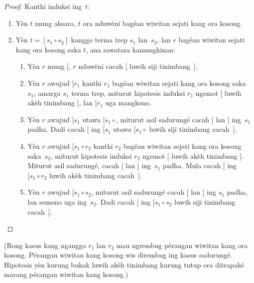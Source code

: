 \documentclass[../../../include/open-logic-section]{subfiles}
\begin{document}
\begin{proof}
  Kanthi induksi ing~$t$:
  \begin{enumerate}
  \item Yèn $t$ mung aksara,
    $t$ ora nduwèni bagéan
    wiwitan sejati kang ora kosong.
  \item Yèn $t = [s_1 \circ s_2]$
    kanggo terma trep $s_1$
    lan~$s_2$, lan $r$ bagéan
    wiwitan sejati kang ora kosong
    saka $t$, ana sawatara
    kamungkinan:
    \begin{enumerate}
    \item Yèn $r$ mung $[$,
      $r$ nduwèni cacah $[$
      luwih siji tinimbang~$]$.
    \item Yèn $r$ awujud
      $[r_1$ kanthi $r_1$
      bagéan wiwitan sejati kang ora kosong
      saka~$s_1$, amarga
      $s_1$ terma trep,
      miturut hipotesis
      induksi $r_1$
      ngemot $[$ luwih
      akèh tinimbang $]$,
      lan $[r_1$ uga
      mangkono.
    \item Yèn $r$ awujud
      $[s_1$ utawa
      $[s_1 \circ {}$,
      miturut asil sadurungé
      cacah $[$ lan $]$
      ing~$s_1$ padha.
      Dadi cacah $[$
      ing $[s_1$ utawa
      $[s_1 \circ {}$
      luwih siji tinimbang
      cacah~$]$.
    \item Yèn $r$ awujud
      $[s_1 \circ r_2$
      kanthi $r_2$ bagéan
      wiwitan sejati kang ora kosong
      saka~$s_2$, miturut
      hipotesis induksi
      $r_2$ ngemot $[$
      luwih akèh tinimbang
      $]$. Miturut asil
      sadurungé, cacah $[$
      lan $]$ ing~$s_1$
      padha. Mula cacah $[$
      ing $[s_1 \circ r_2$
      luwih akèh tinimbang
      cacah~$]$.
    \item Yèn $r$ awujud
      $[s_1 \circ s_2$,
      miturut asil sadurungé
      cacah $[$ lan $]$
      ing $s_1$ padha,
      lan semono uga
      ing~$s_2$. Dadi
      cacah $[$ ing
      $[s_1 \circ s_2$
      luwih siji tinimbang
      cacah~$]$.
    \end{enumerate}
  \end{enumerate}
\end{proof}
(Rong kasus kang nganggo $r_1$ lan $r_2$ mau ngrembug pérangan
wiwitan kang ora kosong. Pérangan wiwitan kang kosong wis dirembug
ing kasus sadurungé. Hipotesis yèn kurung bukak luwih akèh tinimbang
kurung tutup ora ditrapaké marang pérangan wiwitan kang kosong.)
\end{document}
